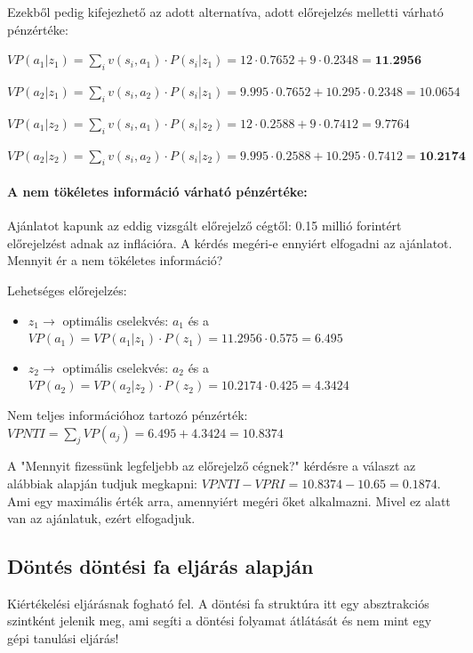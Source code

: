 \documentclass[a4paper,12pt]{article}
\begin{document}
Ezekből pedig kifejezhető az adott alternatíva, adott előrejelzés melletti várható pénzértéke:

$VP(a_1|z_1) = \sum_{i}^{ }v(s_i,a_1)\cdot P(s_i|z_1) = 12\cdot 0.7652 + 9\cdot 0.2348 = \textbf{11.2956}$ 
 
$VP(a_2|z_1) = \sum_{i}v(s_i,a_2)\cdot P(s_i|z_1) = 9.995\cdot 0.7652 + 10.295\cdot 0.2348 = 10.0654$ 

$VP(a_1|z_2) = \sum_{i}v(s_i,a_1)\cdot P(s_i|z_2) = 12\cdot 0.2588 + 9\cdot 0.7412 = 9.7764$  

$VP(a_2|z_2) = \sum_{i}v(s_i,a_2)\cdot P(s_i|z_2) = 9.995\cdot 0.2588 + 10.295\cdot 0.7412 = \textbf{10.2174}$

\paragraph{A nem tökéletes információ várható pénzértéke: }

Ajánlatot kapunk az eddig vizsgált előrejelző cégtől: 0.15 millió forintért előrejelzést adnak az inflációra. A kérdés megéri-e ennyiért elfogadni az ajánlatot. Mennyit ér a nem tökéletes információ?

Lehetséges előrejelzés:
\begin{itemize}
\item $z_{1} \rightarrow$ optimális cselekvés: $a_1$  és a $VP(a_1) = VP(a_1|z_1) \cdot  P(z_1) = 11.2956\cdot 0.575 = 6.495$
\item $z_{2} \rightarrow$ optimális cselekvés: $a_2$  és a $VP(a_2) = VP(a_2|z_2) \cdot  P(z_2) = 10.2174\cdot 0.425 = 4.3424$
\end{itemize}

Nem teljes információhoz tartozó pénzérték: $VPNTI = \sum_{j} VP(a_j) = 6.495 + 4.3424 = 10.8374$

A "Mennyit fizessünk legfeljebb az előrejelző cégnek?" kérdésre a választ az alábbiak alapján tudjuk megkapni: $VPNTI - VPRI = 10.8374 - 10.65 = 0.1874$. Ami egy maximális érték arra, amennyiért megéri őket alkalmazni. Mivel ez alatt van az ajánlatuk, ezért elfogadjuk.

\subsection{Döntés döntési fa eljárás alapján}

Kiértékelési eljárásnak fogható fel. A döntési fa struktúra itt egy absztrakciós szintként jelenik meg, ami segíti a döntési folyamat átlátását és nem mint egy gépi tanulási eljárás!
\end{document}

